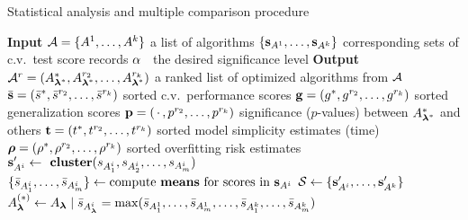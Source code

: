 \begin{algorithm}
\caption{Statistical analysis and multiple comparison procedure} \label{algo:multicomp}
\begin{algorithmic}[1]
\Statex \textbf{Input} \hspace{2mm} $\mathcal{A} = \{A^1,\ldots,A^k \}$ a list of algorithms
\Statex \hspace{14mm} $ \{ \mathbf{s}_{A^1}, \ldots, \mathbf{s}_{A^k} \}$ corresponding sets of c.v.~test score records
\Statex \hspace{14mm} $\alpha \; \;$ the desired significance level
\Statex 
\Statex \textbf{Output}  $\mathcal{A}^r = (A^*_{\boldsymbol{\lambda}^*}, A^{r_2}_{\boldsymbol{\lambda}^*}, \ldots, A^{r_k}_{\boldsymbol{\lambda}^*})$ a ranked list of optimized algorithms from $\mathcal{A}$
\Statex \hspace{14 mm} $\bar{\mathbf{s}} = (\bar{s}^*, \bar{s}^{r_2}, \ldots, \bar{s}^{r_k})$ sorted c.v.~performance scores
\Statex \hspace{14 mm} $\mathbf{g} = (g^*, g^{r_2}, \ldots, g^{r_k})$ sorted generalization scores
\Statex \hspace{14 mm} $\mathbf{p} = (\, \cdot\, , p^{r_2}, \ldots, p^{r_k})$ significance ($p$-values) between $A^*_{\boldsymbol{\lambda}^*}$ and others
\Statex \hspace{14 mm} $\mathbf{t} = (t^*, t^{r_2}, \ldots, t^{r_k})$ sorted model simplicity estimates (time)
\Statex \hspace{14 mm} $\boldsymbol{\rho} = (\rho^*, \rho^{r_2}, \ldots, \rho^{r_k})$ sorted overfitting risk estimates 
\Statex 
{}
\State $\mathbf{s}_{A^i}' \gets  \textrm{\textbf{ cluster}} (s_{A^i_1}, s_{A^i_2}, \ldots , s_{A^i_{m}})$ 
\State $\{ \bar{s}_{A^i_1}, \ldots, \bar{s}_{A^i_m} \} \gets \textrm{compute \textbf{means} for scores in } \mathbf{s}_{A^i}$
\EndFor
\vspace{1mm}
\State $\mathcal{S} \gets \{\mathbf{s}_{A^i}', \ldots, \mathbf{s}_{A^k}' \}$ 
\State $A^{(\ast)}_{\boldsymbol{\lambda}} \gets A_{\boldsymbol{\lambda}} \; | \; \bar{s}_{A^i_{\boldsymbol{\lambda}}} = \operatorname*{max} ( \bar{s}_{A^1_1}, \ldots, \bar{s}_{A^1_m}, \ldots, \bar{s}_{A^k_1}, \ldots, \bar{s}_{A^k_m} )$ 

\end{algorithmic}
\end{algorithm}
